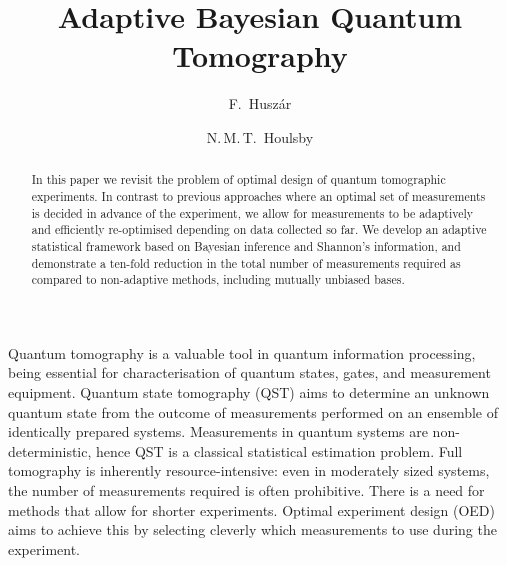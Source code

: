 \documentclass[aps,twocolumn,prl]{revtex4-1}
\begin{document}
%
\title{Adaptive Bayesian Quantum Tomography}

\author{F.~Husz\'{a}r}
%
\author{N.\,M.\,T.~Houlsby}
%

\begin{abstract}
In this paper we revisit the problem of optimal design of quantum tomographic experiments. In contrast to previous approaches where an optimal set of measurements is decided in advance of the experiment, we allow for measurements to be adaptively and efficiently re-optimised depending on data collected so far. We develop an adaptive statistical framework based on Bayesian inference and Shannon's information, and demonstrate a ten-fold reduction in the total number of measurements required as compared to non-adaptive methods, including mutually unbiased bases.
\end{abstract}

\maketitle

Quantum tomography is a valuable tool in quantum information processing, being essential for characterisation of quantum states, gates, and measurement equipment.  Quantum state tomography (QST) aims to determine an unknown quantum state from the outcome of measurements performed on an ensemble of identically prepared systems. Measurements in quantum systems are non-deterministic, hence QST is a classical statistical estimation problem. Full tomography is inherently resource-intensive: even in moderately sized systems, the number of measurements required is often prohibitive.
There is a need for methods that allow for shorter experiments. Optimal experiment design (OED) aims to achieve this by selecting cleverly which measurements to use during the experiment.
\end{document}
